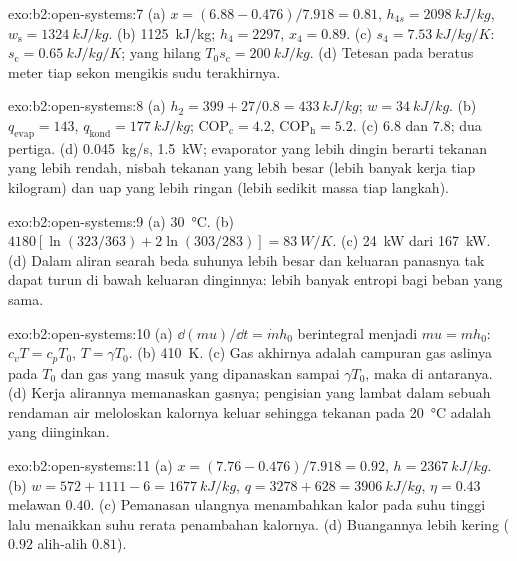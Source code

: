\begin{solution}{exo:b2:open-systems:7}
(a) $x = (6.88 - 0.476)/7.918 = 0.81$, $h_{4s} = \qty{2098}{kJ/kg}$, $w_{\text{s}} =
\qty{1324}{kJ/kg}$. (b) \qty{1125}{kJ/kg}; $h_4 = 2297$, $x_4 = 0.89$. (c) $s_4 =
\qty{7.53}{kJ/kg/K}$: $s_{\text{c}} = \qty{0.65}{kJ/kg/K}$; yang hilang $T_0s_{\text{c}} =
\qty{200}{kJ/kg}$. (d) Tetesan pada beratus meter tiap sekon mengikis
sudu terakhirnya.
\end{solution}

\begin{solution}{exo:b2:open-systems:8}
(a) $h_2 = 399 + 27/0.8 = \qty{433}{kJ/kg}$; $w = \qty{34}{kJ/kg}$. (b) $q_{\text{evap}}
= 143$, $q_{\text{kond}} = \qty{177}{kJ/kg}$; $\mathrm{COP}_{\text{c}} = 4.2$,
$\mathrm{COP}_{\text{h}} = 5.2$. (c) $6.8$ dan $7.8$; dua pertiga. (d) \qty{0.045}{kg/s},
\qty{1.5}{kW}; evaporator yang lebih dingin berarti tekanan yang lebih rendah, nisbah
tekanan yang lebih besar (lebih banyak kerja tiap kilogram) dan uap yang lebih ringan (lebih sedikit
massa tiap langkah).
\end{solution}

\begin{solution}{exo:b2:open-systems:9}
(a) \qty{30}{\celsius}. (b) $4180[\ln(323/363) + 2\ln(303/283)] = \qty{83}{W/K}$.
(c) \qty{24}{kW} dari \qty{167}{kW}. (d) Dalam aliran searah beda suhunya
lebih besar dan keluaran panasnya tak dapat turun di bawah keluaran dinginnya: lebih banyak
entropi bagi beban yang sama.
\end{solution}

\begin{solution}{exo:b2:open-systems:10}
(a) $\dd(mu)/\dd t = \dot m h_0$ berintegral menjadi $mu = mh_0$: $c_vT = c_pT_0$,
$T = \gamma T_0$. (b) \qty{410}{K}. (c) Gas akhirnya adalah campuran gas
aslinya pada $T_0$ dan gas yang masuk yang dipanaskan sampai $\gamma T_0$, maka
di antaranya. (d) Kerja alirannya memanaskan gasnya; pengisian yang lambat dalam sebuah
rendaman air meloloskan kalornya keluar sehingga tekanan pada \qty{20}{\celsius} adalah
yang diinginkan.
\end{solution}

\begin{solution}{exo:b2:open-systems:11}
(a) $x = (7.76 - 0.476)/7.918 = 0.92$, $h = \qty{2367}{kJ/kg}$. (b) $w = 572 + 1111
- 6 = \qty{1677}{kJ/kg}$, $q = 3278 + 628 = \qty{3906}{kJ/kg}$, $\eta = 0.43$
melawan $0.40$. (c) Pemanasan ulangnya menambahkan kalor pada suhu tinggi lalu
menaikkan suhu rerata penambahan kalornya. (d) Buangannya lebih kering
($0.92$ alih-alih $0.81$).
\end{solution}

